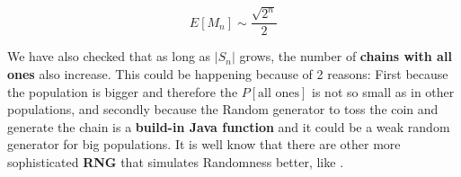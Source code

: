 \documentclass[12pt, a4paper]{article}
\begin{document}
\begin{equation}
  E[M_n] \sim \frac{\sqrt{2^n}}{2} 
\end{equation}

We have also checked that as long as $|S_n|$ grows, the number of \textbf{chains with
  all ones} also increase. This could be happening because of 2 reasons: First
because the population is bigger and therefore the $P[\text{all ones}]$ is not
so small as in other populations, and secondly because the Random generator to
toss the coin and generate the chain is a \textbf{build-in Java function} and it
could be a weak random generator for big populations. It is well know that there are other
more sophisticated \textbf{RNG} that simulates Randomness better, like .
\end{document}
